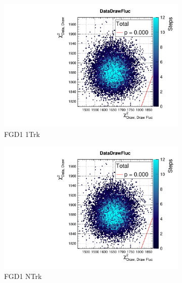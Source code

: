 \begin{figure}[h]
\begin{subfigure}[t]{0.24\textwidth}
	\includegraphics[width=\textwidth, trim={20mm 6mm 4mm 11mm}, clip,page=95]{figures/mach3/data/postpred/2017b_NewData_NewDet_UpdXsecStep_2Xsec_4Det_5Flux_0_PostPred_procs}
	\caption{FGD1 \numu 1Trk}
\end{subfigure}
\begin{subfigure}[t]{0.24\textwidth}
	\includegraphics[width=\textwidth, trim={20mm 6mm 4mm 11mm}, clip,page=104]{figures/mach3/data/postpred/2017b_NewData_NewDet_UpdXsecStep_2Xsec_4Det_5Flux_0_PostPred_procs}
	\caption{FGD1 \numu NTrk}
\end{subfigure}
\begin{subfigure}[t]{0.24\textwidth}

\end{subfigure}
\end{figure}
